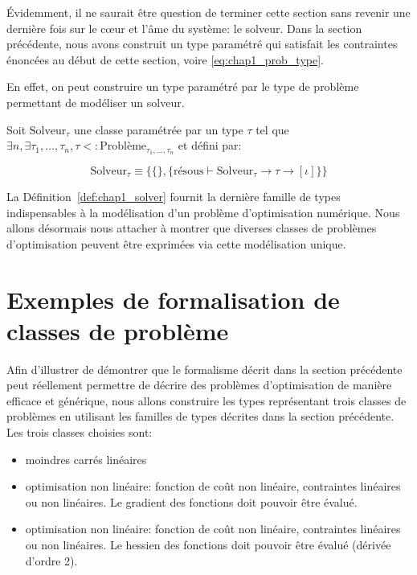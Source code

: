 Évidemment, il ne saurait être question de terminer cette section sans
revenir une dernière fois sur le c\oe ur et l'âme du système: le
solveur. Dans la section précédente, nous avons construit un type
paramétré qui satisfait les contraintes énoncées au début de cette
section, voire \autoref{eq:chap1_prob_type}.


En effet, on peut construire un type paramétré par le type de problème
permettant de modéliser un solveur.

\begin{mydef}\label{def:chap1_solver}
  Soit $\text{Solveur}_{\tau}$ une classe paramétrée par un type $\tau$
  tel que $\exists n, \exists \tau_1, \dotsc, \tau_n, \tau <:
  \text{Problème}_{\tau_1, \dotsc, \tau_n}$ et défini par:

  \begin{equation}
    \text{Solveur}_{\tau} \equiv \{ \{ \}, \{ \text{résous} \vdash
    \text{Solveur}_{\tau} \rightarrow \tau \rightarrow [\iota] \} \}
  \end{equation}
\end{mydef}

La Définition \ref{def:chap1_solver} fournit la dernière famille de
types indispensables à la modélisation d'un problème d'optimisation
numérique. Nous allons désormais nous attacher à montrer que diverses
classes de problèmes d'optimisation peuvent être exprimées via cette
modélisation unique.


\section{Exemples de formalisation de classes de problème}
\label{sec:chap1_model2impl_typage_ex}


Afin d'illustrer de démontrer que le formalisme décrit dans la section
précédente peut réellement permettre de décrire des problèmes
d'optimisation de manière efficace et générique, nous allons
construire les types représentant trois classes de problèmes en
utilisant les familles de types décrites dans la section
précédente. Les trois classes choisies sont:

\begin{itemize}
\item moindres carrés linéaires
\item optimisation non linéaire: fonction de coût non linéaire,
  contraintes linéaires ou non linéaires. Le gradient des fonctions
  doit pouvoir être évalué.
\item optimisation non linéaire: fonction de coût non linéaire,
  contraintes linéaires ou non linéaires. Le hessien
  des fonctions doit pouvoir être évalué (dérivée d'ordre 2).
\end{itemize}



